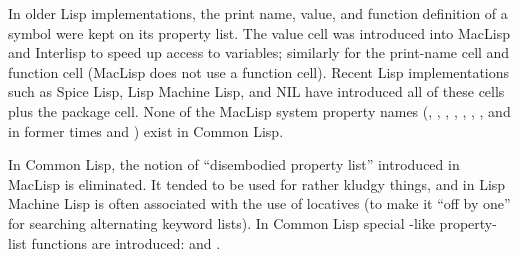 \beforenoterule
\begin{incompatibility}
In older Lisp implementations, the
print name, value, and function definition of a symbol were kept on its
property list.  The value cell was introduced into MacLisp and Interlisp
to speed up access to variables; similarly for the
print-name cell and function cell (MacLisp does not use a function cell).
Recent Lisp implementations such as Spice Lisp,
Lisp Machine Lisp, and NIL have
introduced all of these cells plus the
package cell.
None of the MacLisp system property names
(, , , ,
, , , and in former times  and
) exist in Common Lisp.

In Common Lisp, the notion of ``disembodied property list''
introduced in MacLisp is eliminated.  It tended to be used for
rather kludgy things, and in Lisp Machine Lisp is often associated with
the use of locatives (to make it ``off by one'' for searching
alternating keyword lists).  In Common Lisp special -like
property-list functions are introduced: 
and .
\end{incompatibility}
\afternoterule

